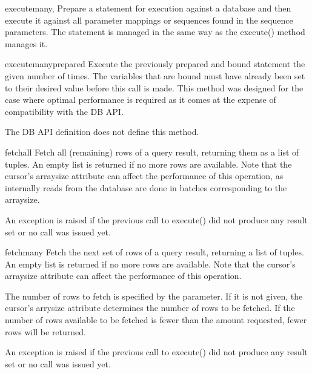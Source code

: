 \documentclass{manual}
\begin{document}
\begin{funcdesc}{executemany}{, }
  Prepare a statement for execution against a database and then execute it
  against all parameter mappings or sequences found in the sequence parameters.
  The statement is managed in the same way as the execute() method manages it.
\end{funcdesc}

\begin{funcdesc}{executemanyprepared}{}
  Execute the previously prepared and bound statement the given number of
  times. The variables that are bound must have already been set to their
  desired value before this call is made.  This method was designed for the
  case where optimal performance is required as it comes at the expense of
  compatibility with the DB API.

   The DB API definition does not define this method.
\end{funcdesc}

\begin{funcdesc}{fetchall}{}
  Fetch all (remaining) rows of a query result, returning them as a list of
  tuples. An empty list is returned if no more rows are available. Note that
  the cursor's arraysize attribute can affect the performance of this
  operation, as internally reads from the database are done in batches
  corresponding to the arraysize.

  An exception is raised if the previous call to execute() did not produce any
  result set or no call was issued yet.
\end{funcdesc}

\begin{funcdesc}{fetchmany}{}
  Fetch the next set of rows of a query result, returning a list of tuples. An
  empty list is returned if no more rows are available. Note that the cursor's
  arraysize attribute can affect the performance of this operation.

  The number of rows to fetch is specified by the parameter. If it is not
  given, the cursor's arrysize attribute determines the number of rows to be
  fetched. If the number of rows available to be fetched is fewer than the
  amount requested, fewer rows will be returned.

  An exception is raised if the previous call to execute() did not produce any
  result set or no call was issued yet.
\end{funcdesc}
\end{document}
